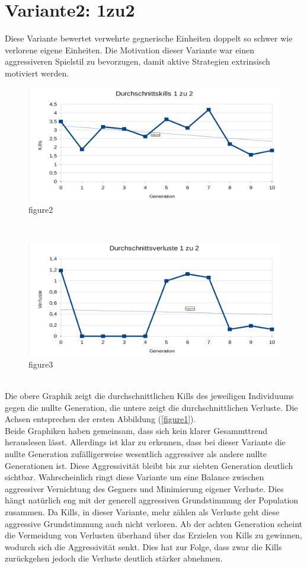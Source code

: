 \documentclass[
	12pt,
	a4paper,
	BCOR10mm,
	DIV14,
	headsepline,
	usegeometry,
]{scrreprt}
\begin{document}
\section{Variante2: 1zu2}
Diese Variante bewertet verwehrte gegnerische Einheiten doppelt so schwer wie verlorene eigene Einheiten. Die Motivation dieser Variante war einen aggressiveren Spielstil zu bevorzugen, damit aktive Strategien extrinsisch motiviert werden.
\begin{figure}[h]
	\includegraphics[width = \textwidth]{Durchschnittskills1zu2.png}
	\caption{figure2}
	\label{figure2}
\end{figure}\\
\begin{figure}[h]
	\includegraphics[width = \textwidth]{Durchschnittsverluste1zu2.png}
	\caption{figure3}
	\label{figure3}
\end{figure}\\
Die obere Graphik zeigt die durchschnittlichen Kills des jeweiligen Individuums gegen die nullte Generation, die untere zeigt die durchschnittlichen Verluste. Die Achsen entsprechen der ersten Abbildung (\ref{figure1}).\\
Beide Graphiken haben gemeinsam, dass sich kein klarer Gesammttrend herauslesen lässt. Allerdings ist klar zu erkennen, dass bei dieser Variante die nullte Generation zufälligerweise wesentlich aggressiver als andere nullte Generationen ist. Diese Aggressivität bleibt bis zur siebten Generation deutlich sichtbar. Wahrscheinlich ringt diese Variante um eine Balance zwischen aggressiver Vernichtung des Gegners und Minimierung eigener Verluste. Dies hängt natürlich eng mit der generell aggressiven Grundstimmung der Population zusammen. Da Kills, in dieser Variante, mehr zählen als Verluste geht diese aggressive Grundstimmung auch nicht verloren. Ab der achten Generation scheint die Vermeidung von Verlusten überhand über das Erzielen von Kills zu gewinnen, wodurch sich die Aggressivität senkt. Dies hat zur Folge, dass zwar die Kills zurückgehen jedoch die Verluste deutlich stärker abnehmen.
\end{document}
